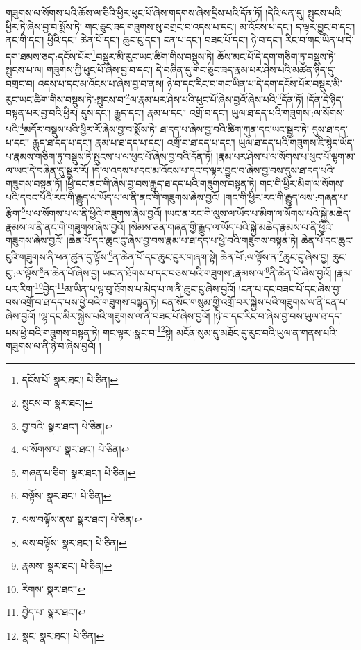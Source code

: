 གཟུགས་ལ་སོགས་པའི་ཆོས་ལ་ཅིའི་ཕྱིར་ཕུང་པོ་ཞེས་གདགས་ཞེས་དྲིས་པའི་དོན་ཏོ། །དེའི་ལན་དུ། སྤུངས་པའི་ཕྱིར་ཏེ་ཞེས་བྱ་བ་སྨོས་ཏེ། གང་ཅུང་ཟད་གཟུགས་སུ་བགྲང་བ་འདས་པ་དང་། མ་འོངས་པ་དང་། ད་ལྟར་བྱུང་བ་དང་། ནང་གི་དང་། ཕྱིའི་དང་། ཆེན་པོ་དང་། ཆུང་ངུ་དང་། ངན་པ་དང་། བཟང་པོ་དང་། ཉེ་བ་དང་། རིང་བ་གང་ཡིན་པ་དེ་དག་ཐམས་ཅད་:དངོས་པོར་\footnote{དངོས་པོ་  སྣར་ཐང་།  པེ་ཅིན། }བསྡུར་མི་རུང་ཡང་ཚིག་གིས་བསྡུས་ཏེ། ཆོས་མང་པོ་དེ་དག་གཅིག་ཏུ་བསྡུས་ཏེ་སྤུངས་པ་ལ། གཟུགས་ཀྱི་ཕུང་པོ་ཞེས་བྱ་བ་དང་། དེ་བཞིན་དུ་གང་ཅུང་ཟད་རྣམ་པར་ཤེས་པའི་མཚན་ཉིད་དུ་བགྲང་བ། འདས་པ་དང་མ་འོངས་པ་ཞེས་བྱ་བ་ནས། ཉེ་བ་དང་རིང་བ་གང་ཡིན་པ་དེ་དག་དངོས་པོར་བསྡུར་མི་རུང་ཡང་ཚིག་གིས་བསྡུས་ཏེ་:སྤུངས་བ་\footnote{སྲུངས་བ་  སྣར་ཐང་། }ལ་རྣམ་པར་ཤེས་པའི་ཕུང་པོ་ཞེས་བྱའོ་ཞེས་པའི་\footnote{བྱ་བའི་  སྣར་ཐང་།  པེ་ཅིན། }དོན་ཏོ། །དོན་དེ་ཉིད་བསྟན་པར་བྱ་བའི་ཕྱིར། དུས་དང་། རྒྱུད་དང་། རྣམ་པ་དང་། འགྲོ་བ་དང་། ཡུལ་ཐ་དད་པའི་གཟུགས་:ལ་སོགས་པའི་\footnote{ལ་སོགས་པ་  སྣར་ཐང་།  པེ་ཅིན། }མདོར་བསྡུས་པའི་ཕྱིར་རོ་ཞེས་བྱ་བ་སྨོས་ཏེ། ཐ་དད་པ་ཞེས་བྱ་བའི་ཚིག་ཀུན་དང་ཡང་སྦྱར་ཏེ། དུས་ཐ་དད་པ་དང་། རྒྱུད་ཐ་དད་པ་དང་། རྣམ་པ་ཐ་དད་པ་དང་། འགྲོ་བ་ཐ་དད་པ་དང་། ཡུལ་ཐ་དད་པའི་གཟུགས་ཇི་སྙེད་ཡོད་པ་རྣམས་གཅིག་ཏུ་བསྡུས་ཏེ་སྤུངས་པ་ལ་ཕུང་པོ་ཞེས་བྱ་བའི་དོན་ཏོ། །རྣམ་པར་ཤེས་པ་ལ་སོགས་པ་ཕུང་པོ་ལྷག་མ་ལ་ཡང་དེ་བཞིན་དུ་སྦྱར་རོ། །དེ་ལ་འདས་པ་དང་མ་འོངས་པ་དང་ད་ལྟར་བྱུང་བ་ཞེས་བྱ་བས་དུས་ཐ་དད་པའི་གཟུགས་བསྟན་ཏོ། །ཕྱི་དང་ནང་གི་ཞེས་བྱ་བས་རྒྱུད་ཐ་དད་པའི་གཟུགས་བསྟན་ཏེ། གང་གི་ཕྱིར་མིག་ལ་སོགས་པའི་དབང་པོའི་རང་གི་རྒྱུད་ལ་ཡོད་པ་ལ་ནི་ནང་གི་གཟུགས་ཞེས་བྱའོ། །གང་གི་ཕྱིར་རང་གི་རྒྱུད་ལས་:གཞན་པ་རྩིག་\footnote{གཞན་པ་ཅིག་  སྣར་ཐང་།  པེ་ཅིན། }པ་ལ་སོགས་པ་ལ་ནི་ཕྱིའི་གཟུགས་ཞེས་བྱའོ། །ཡང་ན་རང་གི་ལུས་ལ་ཡོད་པ་མིག་ལ་སོགས་པའི་སྐྱེ་མཆེད་རྣམས་ལ་ནི་ནང་གི་གཟུགས་ཞེས་བྱའོ། །སེམས་ཅན་གཞན་གྱི་རྒྱུད་ལ་ཡོད་པའི་སྐྱེ་མཆེད་རྣམས་ལ་ནི་ཕྱིའི་གཟུགས་ཞེས་བྱའོ། །ཆེན་པོ་དང་ཆུང་ངུ་ཞེས་བྱ་བས་རྣམ་པ་ཐ་དད་པ་ཕྱེ་བའི་གཟུགས་བསྟན་ཏེ། ཆེན་པོ་དང་ཆུང་ངུའི་གཟུགས་ནི་ཕན་ཚུན་དུ་ལྟོས་\footnote{བལྟོས་  སྣར་ཐང་།  པེ་ཅིན། }ན་ཆེན་པོ་དང་ཆུང་ངུར་གཞག་སྟེ། ཆེན་པོ་:ལ་ལྟོས་ན་\footnote{ལས་བལྟོས་ནས་  སྣར་ཐང་།  པེ་ཅིན། }ཆུང་ངུ་ཞེས་བྱ། ཆུང་ངུ་:ལ་ལྟོས་\footnote{ལས་བལྟོས་  སྣར་ཐང་།  པེ་ཅིན། }ན་ཆེན་པོ་ཞེས་བྱ། ཡང་ན་ཐོགས་པ་དང་བཅས་པའི་གཟུགས་:རྣམས་ལ་\footnote{རྣམས་  སྣར་ཐང་།  པེ་ཅིན། }ནི་ཆེན་པོ་ཞེས་བྱའོ། །རྣམ་པར་རིག་\footnote{རིགས་  སྣར་ཐང་། }བྱེད་\footnote{བྱེད་པ་  སྣར་ཐང་། }མ་ཡིན་པ་ལྟ་བུ་ཐོགས་པ་མེད་པ་ལ་ནི་ཆུང་ངུ་ཞེས་བྱའོ། །ངན་པ་དང་བཟང་པོ་དང་ཞེས་བྱ་བས་འགྲོ་བ་ཐ་དད་པས་ཕྱེ་བའི་གཟུགས་བསྟན་ཏེ། ངན་སོང་གསུམ་གྱི་འགྲོ་བར་སྐྱེས་པའི་གཟུགས་ལ་ནི་ངན་པ་ཞེས་བྱའོ། །ལྷ་དང་མིར་སྐྱེས་པའི་གཟུགས་ལ་ནི་བཟང་པོ་ཞེས་བྱའོ། །ཉེ་བ་དང་རིང་བ་ཞེས་བྱ་བས་ཡུལ་ཐ་དད་པས་ཕྱེ་བའི་གཟུགས་བསྟན་ཏེ། གང་ལྟར་:སྣང་བ་\footnote{སྣང་  སྣར་ཐང་།  པེ་ཅིན། }སྟེ། མངོན་སུམ་དུ་མཐོང་དུ་རུང་བའི་ཡུལ་ན་གནས་པའི་གཟུགས་ལ་ནི་ཉེ་བ་ཞེས་བྱའོ། །
